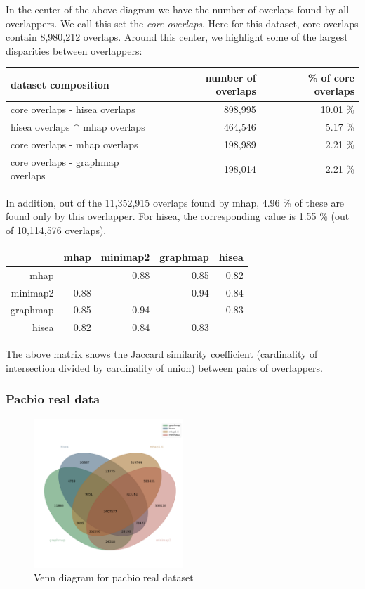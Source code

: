 \documentclass[./main.tex]{subfiles}
\begin{document}
In the center of the above diagram we have the number of overlaps found
by all overlappers. We call this set the \emph{core overlaps}. Here for
this dataset, core overlaps contain 8,980,212 overlaps. Around this
center, we highlight some of the largest disparities between
overlappers:

\begin{table}[ht]
\centering
\begin{tabular}{lrr}
\hline
dataset composition & number of overlaps & \% of core overlaps \\
\hline
core overlaps - hisea overlaps & 898,995 & 10.01 \% \\
hisea overlaps \(\cap\) mhap overlaps & 464,546 & 5.17 \% \\
core overlaps - mhap overlaps & 198,989 & 2.21 \% \\
core overlaps - graphmap overlaps & 198,014 & 2.21 \% \\
\hline
\end{tabular}
\end{table}

In addition, out of the 11,352,915 overlaps found by mhap, 4.96 \% of
these are found only by this overlapper. For hisea, the corresponding
value is 1.55 \% (out of 10,114,576 overlaps).

\begin{table}[ht]
\centering
\begin{tabular}{rrrrr}
\hline
& mhap & minimap2 & graphmap & hisea \\
\hline
mhap & & 0.88 & 0.85 & 0.82 \\
minimap2 & 0.88 & & 0.94 & 0.84 \\
graphmap & 0.85 & 0.94 & & 0.83 \\
hisea & 0.82 & 0.84 & 0.83 & \\
\hline
\end{tabular}
\end{table}
The above matrix shows the Jaccard similarity coefficient (cardinality
of intersection divided by cardinality of union) between pairs of
overlappers.

\subsubsection{Pacbio real data}\label{preassembly:ovl:pacbio-real-data}

\begin{figure}[ht]
\centering
\includegraphics[width=0.5\textwidth]{paper/blog_post/pacbio_venn.png}
\caption{Venn diagram for pacbio real dataset}
\end{figure}
\end{document}
